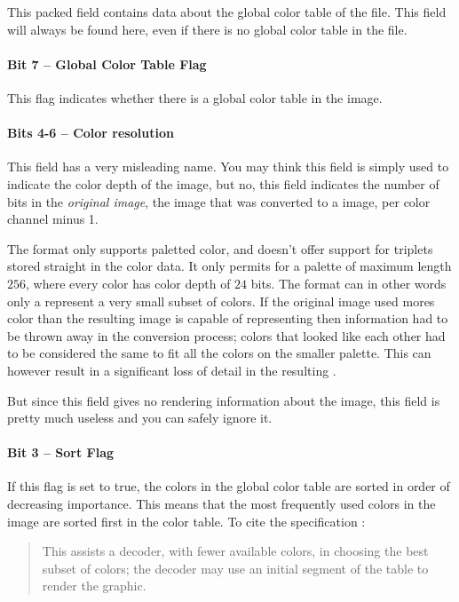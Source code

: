 This packed field contains data about the global color table of the
file. This field will always be found here, even if there is no global
color table in the file.

\paragraph{Bit 7 --  Global Color Table Flag}

This flag indicates whether there is a global color table in the
image.

\paragraph{Bits 4-6 -- Color resolution}

This field has a very misleading name. You may think this field is
simply used to indicate the color depth of the image, but no, this
field indicates the number of bits in the \textit{original image}, the
image that was converted to a \gif image, per color channel minus 1.

The \gif format only supports paletted color, and doesn't offer support
for \rgb triplets stored straight in the color data. It only permits
for a palette of maximum length $256$, where every color has color
depth of $24$ bits. The \gif format can in other words only a represent
a very small subset of colors. If the original image used mores color
than the resulting \gif image is capable of representing then
information had to be thrown away in the conversion process; colors
that looked like each other had to be considered the same to fit all
the colors on the smaller palette. This can however result in a
significant loss of detail in the resulting \gif.

But since this field gives no rendering information about the image,
this field is pretty much useless and you can safely ignore it.

\paragraph{Bit 3 -- Sort Flag}

If this flag is set to true, the colors in the global color table are
sorted in order of decreasing importance. This means that the most
frequently used colors in the image are sorted first in the color
table. To cite the \gif specification \cite{gif89a}:

\begin{quote}
  This assists a decoder, with fewer available colors, in choosing
  the best subset of colors; the decoder may use an initial segment
  of the table to render the graphic.
\end{quote}

